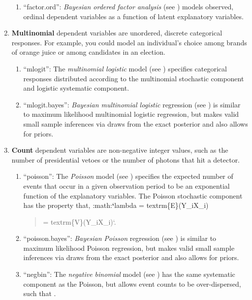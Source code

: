 \documentclass[letterpaper,10pt,english]{sphinxmanual}
\begin{document}
\begin{enumerate}
\begin{enumerate}
\item {} 
“factor.ord”: \emph{Bayesian ordered factor analysis} (see ) models
observed, ordinal dependent variables as a function of latent
explanatory variables.

\end{enumerate}

\item {} 
\textbf{Multinomial} dependent variables are unordered, discrete
categorical responses. For example, you could model an individual’s
choice among brands of orange juice or among candidates in an
election.
\begin{enumerate}
\item {} 
“mlogit”: The \emph{multinomial logistic} model (see ) specifies
categorical responses distributed according to the multinomial
stochastic component and logistic systematic component.

\item {} 
“mlogit.bayes”: \emph{Bayesian multinomial logistic} regression (see )
is similar to maximum likelihood multinomial logistic regression,
but makes valid small sample inferences via draws from the exact
posterior and also allows for priors.

\end{enumerate}

\item {} 
\textbf{Count} dependent variables are non-negative integer values, such
as the number of presidential vetoes or the number of photons that
hit a detector.
\begin{enumerate}
\item {} 
“poisson”: The \emph{Poisson} model (see ) specifies the expected
number of events that occur in a given observation period to be an
exponential function of the explanatory variables. The Poisson
stochastic component has the property that,
:math:{\color{red}\bfseries{}{}`}lambda = textrm\{E\}(Y\_i\textbar{}X\_i)
\begin{quote}

= textrm\{V\}(Y\_i\textbar{}X\_i){}`.
\end{quote}

\item {} 
“poisson.bayes”: \emph{Bayesian Poisson} regression (see ) is similar
to maximum likelihood Poisson regression, but makes valid small
sample inferences via draws from the exact posterior and also
allows for priors.

\item {} 
“negbin”: The \emph{negative binomial} model (see ) has the same
systematic component as the Poisson, but allows event counts to be
over-dispersed, such that
.


\end{enumerate}
\end{enumerate}
\end{document}
